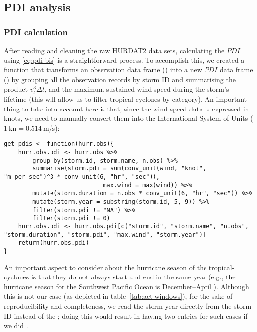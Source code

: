 \subsection{PDI analysis}\label{sec:pdi-stats}

\subsubsection{PDI calculation}\label{ssec:pdi-calc}
After reading and cleaning the raw HURDAT2 data sets, calculating the $PDI$ using \eqref{eq:pdi-bis} is a straightforward process. To accomplish this, we created a function that transforms an observation data frame () into a new $PDI$ data frame () by grouping all the observation records by storm ID and summarising the product $v_{t}^{3} \Delta t$, and the maximum sustained wind speed during the storm's lifetime (this will allow us to filter tropical-cyclones by category). An important thing to take into account here is that, since the wind speed data is expressed in knots, we need to manually convert them into the International System of Units ($\SI{1}{\knot} = \SI{0.514}{\m\per\s}$):
\begin{lstlisting}[caption=Function to calculate a $PDI$ data frame, label=snp:hurdat-pdis]
get_pdis <- function(hurr.obs){
	hurr.obs.pdi <- hurr.obs %>%
		group_by(storm.id, storm.name, n.obs) %>%
		summarise(storm.pdi = sum(conv_unit(wind, "knot", "m_per_sec")^3 * conv_unit(6, "hr", "sec")),
							max.wind = max(wind)) %>%
		mutate(storm.duration = n.obs * conv_unit(6, "hr", "sec")) %>%
		mutate(storm.year = substring(storm.id, 5, 9)) %>%
		filter(storm.pdi != "NA") %>%
		filter(storm.pdi != 0)
	hurr.obs.pdi <- hurr.obs.pdi[c("storm.id", "storm.name", "n.obs", "storm.duration", "storm.pdi", "max.wind", "storm.year")]
	return(hurr.obs.pdi)
}
\end{lstlisting}

An important aspect to consider about the hurricane season of the tropical-cyclones is that they do not always start and end in the same year (e.g., the hurricane season for the Southwest Pacific Ocean is December--April \cite{Webster2005}). Although this is not our case (as depicted in table~\ref{tab:act-windows}), for the sake of reproducibility and completeness, we read the storm year directly from the storm ID instead of the ; doing this would result in having two entries for such cases if we did .

